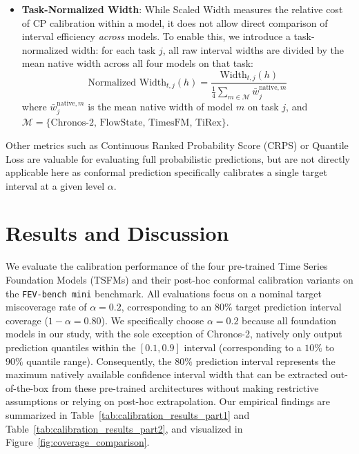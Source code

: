 \documentclass[12pt, a4paper]{article}
\begin{document}
\begin{itemize}
	\item \textbf{Task-Normalized Width}: While Scaled Width measures the relative cost of CP calibration within a model, it does not allow direct comparison of interval efficiency \textit{across} models. To enable this, we introduce a task-normalized width: for each task \(j\), all raw interval widths are divided by the mean native width across all four models on that task:
		\begin{equation}
			\text{Normalized Width}_{t, j}(h) = \frac{\text{Width}_{t, j}(h)}{\frac{1}{4} \sum_{m \in \mathcal{M}} \bar{w}_{j}^{\text{native}, m}}
		\end{equation}
		where \(\bar{w}_{j}^{\text{native}, m}\) is the mean native width of model \(m\) on task \(j\), and \(\mathcal{M} = \{\text{Chronos-2, FlowState, TimesFM, TiRex}\}\).
\end{itemize}

Other metrics such as Continuous Ranked Probability Score (CRPS) or Quantile Loss are valuable for evaluating full probabilistic predictions, but are not directly applicable here as conformal prediction specifically calibrates a single target interval at a given level \(\alpha\).

\section{Results and Discussion}
We evaluate the calibration performance of the four pre-trained Time Series Foundation Models (TSFMs) and their post-hoc conformal calibration variants on the \texttt{FEV-bench mini} benchmark. All evaluations focus on a nominal target miscoverage rate of \(\alpha = 0.2\), corresponding to an \(80\%\) target prediction interval coverage (\(1-\alpha=0.80\)). We specifically choose \(\alpha = 0.2\) because all foundation models in our study, with the sole exception of Chronos-2, natively only output prediction quantiles within the \([0.1, 0.9]\) interval (corresponding to a \(10\%\) to \(90\%\) quantile range). Consequently, the \(80\%\) prediction interval represents the maximum natively available confidence interval width that can be extracted out-of-the-box from these pre-trained architectures without making restrictive assumptions or relying on post-hoc extrapolation. Our empirical findings are summarized in Table~\ref{tab:calibration_results_part1} and Table~\ref{tab:calibration_results_part2}, and visualized in Figure~\ref{fig:coverage_comparison}.
\end{document}
